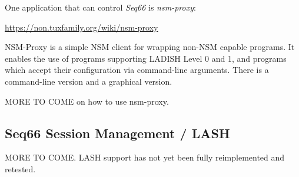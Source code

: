    One application that can control \textsl{Seq66} is \textsl{nsm-proxy}:

      \url{https://non.tuxfamily.org/wiki/nsm-proxy}

   NSM-Proxy is a simple NSM client for wrapping non-NSM capable programs. It
   enables the use of programs supporting LADISH Level 0 and 1, and programs
   which accept their configuration via command-line arguments.  There is a
   command-line version and a graphical version.

   MORE TO COME on how to use nsm-proxy.

\subsection{Seq66 Session Management / LASH}
\label{subsec:sessions_lash}

   MORE TO COME.  LASH support has not yet been fully reimplemented and retested.




